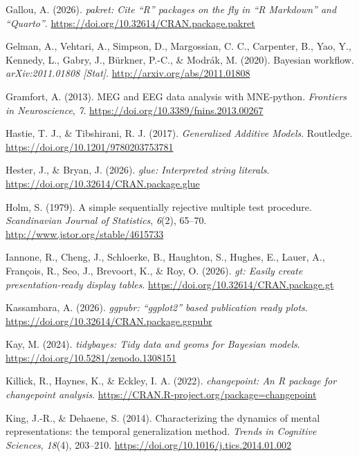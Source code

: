 \documentclass[
  doc,
  floatsintext,
  longtable,
  a4paper,
  nolmodern,
  notxfonts,
  notimes,
  colorlinks=true,linkcolor=blue,citecolor=blue,urlcolor=blue]{apa7}
\newlength{\cslhangindent}
\newenvironment{CSLReferences}[2] %
 {\begin{list}{}{%
  \setlength{\itemindent}{0pt}
  \setlength{\leftmargin}{0pt}
  \setlength{\parsep}{0pt}
  \ifodd #1
   \setlength{\leftmargin}{\cslhangindent}
   \setlength{\itemindent}{-1\cslhangindent}
  \fi
  \setlength{\itemsep}{#2\baselineskip}}}
 {\end{list}}
\begin{document}
\begin{CSLReferences}{1}{0}
Gallou, A. (2026). \emph{{pakret}: Cite {``{R}''} packages on the fly in
{``{R Markdown}''} and {``{Quarto}''}}.
\url{https://doi.org/10.32614/CRAN.package.pakret}

Gelman, A., Vehtari, A., Simpson, D., Margossian, C. C., Carpenter, B.,
Yao, Y., Kennedy, L., Gabry, J., Bürkner, P.-C., \& Modrák, M. (2020).
Bayesian workflow. \emph{arXiv:2011.01808 {[}Stat{]}}.
\url{http://arxiv.org/abs/2011.01808}

Gramfort, A. (2013). MEG and EEG data analysis with MNE-python.
\emph{Frontiers in Neuroscience}, \emph{7}.
\url{https://doi.org/10.3389/fnins.2013.00267}

Hastie, T. J., \& Tibshirani, R. J. (2017). \emph{Generalized Additive
Models}. Routledge. \url{https://doi.org/10.1201/9780203753781}

Hester, J., \& Bryan, J. (2026). \emph{{glue}: Interpreted string
literals}. \url{https://doi.org/10.32614/CRAN.package.glue}

Holm, S. (1979). A simple sequentially rejective multiple test
procedure. \emph{Scandinavian Journal of Statistics}, \emph{6}(2),
65--70. \url{http://www.jstor.org/stable/4615733}

Iannone, R., Cheng, J., Schloerke, B., Haughton, S., Hughes, E., Lauer,
A., François, R., Seo, J., Brevoort, K., \& Roy, O. (2026). \emph{{gt}:
Easily create presentation-ready display tables}.
\url{https://doi.org/10.32614/CRAN.package.gt}

Kassambara, A. (2026). \emph{{ggpubr}: {``{ggplot2}''} based publication
ready plots}. \url{https://doi.org/10.32614/CRAN.package.ggpubr}

Kay, M. (2024). \emph{{tidybayes}: Tidy data and geoms for {Bayesian}
models}. \url{https://doi.org/10.5281/zenodo.1308151}

Killick, R., Haynes, K., \& Eckley, I. A. (2022). \emph{{changepoint}:
An {R} package for changepoint analysis}.
\url{https://CRAN.R-project.org/package=changepoint}

King, J.-R., \& Dehaene, S. (2014). Characterizing the dynamics of
mental representations: the temporal generalization method. \emph{Trends
in Cognitive Sciences}, \emph{18}(4), 203--210.
\url{https://doi.org/10.1016/j.tics.2014.01.002}


\end{CSLReferences}
\end{document}
